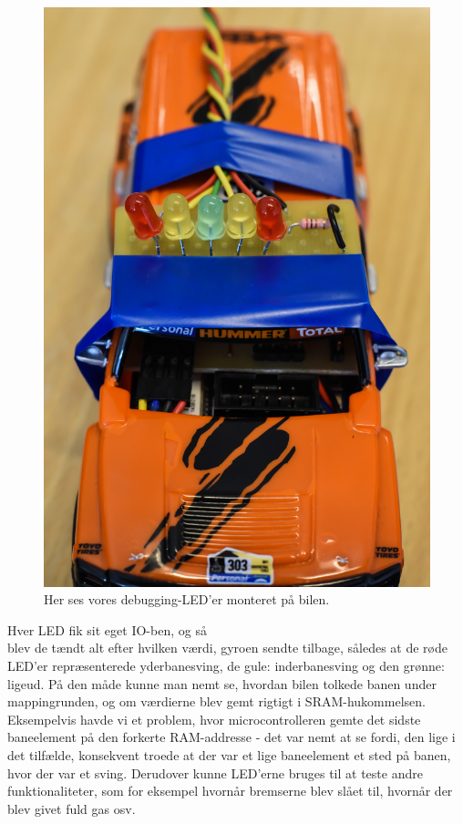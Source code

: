 \begin{figure}
	\begin{minipage}{.3\textwidth}
	\centering
		\includegraphics[scale=0.04]{Billeder/Debug-lys.JPG}
	\caption{Her ses vores debugging-LED'er monteret på bilen.}
	\label{fig:Udrykning}
	\end{minipage}
\end{figure}

Hver LED fik sit eget IO-ben, og så \\ blev de tændt alt efter hvilken værdi, gyroen sendte tilbage, således at de røde LED'er repræsenterede yderbanesving, de gule: inderbanesving og den grønne: ligeud. På den måde kunne man nemt se, hvordan bilen tolkede banen under mappingrunden, og om værdierne blev gemt rigtigt i SRAM-hukommelsen.	Eksempelvis havde vi et problem, hvor microcontrolleren gemte det sidste baneelement på den forkerte RAM-addresse - det var nemt at se fordi, den lige i det tilfælde, konsekvent troede at der var et lige baneelement et sted på banen, hvor der var et sving. Derudover kunne LED'erne bruges til at teste andre funktionaliteter, som for eksempel hvornår bremserne blev slået til, hvornår der blev givet fuld gas osv.
